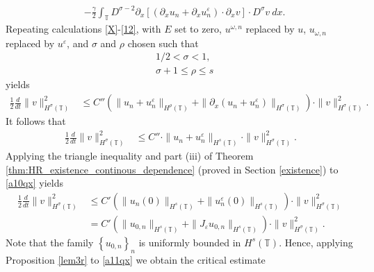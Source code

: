 \documentclass[12pt,reqno]{amsart}
\newcommand{\p}{\partial}
\newcommand{\ci}{\mathbb{T}}
\newcommand{\ee}{\varepsilon}
\theoremstyle{plain}  %
\theoremstyle{definition}
\begin{document}
\begin{appendices}
\begin{equation*}
\begin{split}
		\\
		& - \frac{\gamma}{2}\int_{\ci} D^{\sigma
		-2}
		\p_x \left[ \left( \p_x u_n + \p_x u^\ee_n
		\right)\cdot \p_x v \right] \cdot
		D^\sigma v \ dx.
	\end{split}
\end{equation*}
Repeating calculations \eqref{X}-\eqref{12}, with $E$ set to zero,
$u^{\omega,n}$ replaced by $u$, $u_{\omega,n}$ replaced by $u^\ee$, and
$\sigma$ and $\rho$ chosen such that
%
\begin{equation}
	\begin{split}
	& 1/2 < \sigma < 1,
	\\
	& \sigma + 1 \le \rho \le s 
	\end{split}
\end{equation}
yields
 \begin{equation*}
	\begin{split}
		\frac{1}{2}\frac{d}{dt} \|v\|_{H^\sigma(\ci)}^2
		& \le
		C'' (\|u_n + u^\ee_n \|_{H^{\rho}(\ci)} +
		\|\p_x(u_n + u^\ee_n) \|_{H^\sigma(\ci)})
		\cdot \|v\|_{H^\sigma(\ci)}^2.
	\end{split}
\end{equation*}
\medskip
It follows that 
\begin{equation}
	\begin{split}
		\frac{1}{2}\frac{d}{dt} \|v\|_{H^{\sigma}(\ci)}^2
		& \le
		C'' \cdot \|u_n
		+ u^\ee_n\|_{H^{s}(\ci)}\cdot \|v\|_{H^{\sigma}(\ci)}^2.
		\label{a10qx}
	\end{split}
\end{equation}
Applying the triangle inequality and
part (iii) of Theorem \ref{thm:HR_existence_continous_dependence} (proved in
Section \ref{existence})
to \eqref{a10qx} yields
%
\begin{equation}
	\begin{split}
		\label{a11qx}
		\frac{1}{2}\frac{d}{dt} \|v\|_{H^{\sigma}(\ci)}^2
		& \le
		C' (\|u_n(0)\|_{H^{s}(\ci)}
		+ \|u^\ee_n(0)\|_{H^{s}(\ci)})\cdot \|v\|_{H^{\sigma}(\ci)}^2
		\\
		& = C' (\|u_{0,n}\|_{H^{s}(\ci)}
		+ \|J_\ee u_{0,n}\|_{H^{s}(\ci)})\cdot \|v\|_{H^{\sigma}(\ci)}^2.
	\end{split}
\end{equation}
Note that the family $\left\{ u_{0,n} \right\}_n$ is uniformly bounded in
$H^s(\ci)$. Hence, applying Proposition \ref{lem3r} to \eqref{a11qx} we obtain the critical estimate 
\begin{equation}
	\begin{split}
		\label{a12qx}

\end{split}
\end{equation}
\end{appendices}
\end{document}
